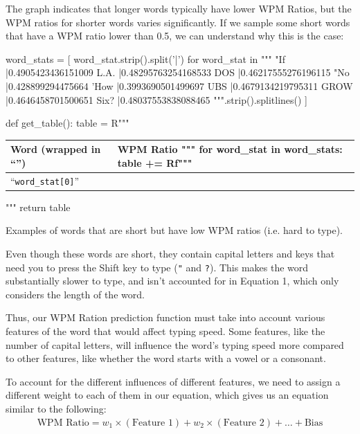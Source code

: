 \documentclass[12pt]{article}
\newcommand{\code}[1]{\texttt{#1}}
\begin{document}
The graph indicates that longer words typically have lower WPM Ratios, but the WPM ratios for shorter words varies significantly. If we sample some short words that have a WPM ratio lower than 0.5, we can understand why this is the case:

\begin{pycode}
word_stats = [
	word_stat.strip().split('|') for word_stat in """
		"If |0.4905423436151009
		L.A. |0.48295763254168533
		DOS |0.46217555276196115
		"No |0.428899294475664
		'How |0.3993690501499697
		UBS |0.4679134219795311
		GROW |0.4646458701500651
		Six? |0.48037553838088465
	""".strip().splitlines()
]

def get_table():
	table = R"""
		\begin{center}
		\noindent
		\begin{tabularx}{
			0.5\linewidth
		}{|X|X|}
		\hline
		Word (wrapped in ``'') & WPM Ratio
	"""
	for word_stat in word_stats:
		table += Rf"""
			\\\hline
			``\code{{{word_stat[0]}}}'' & {"%
		"""
	table += R"""
		\\\hline
		\end{tabularx}
		\end{center}
	"""
	return table
\end{pycode}

\begin{table}[H]
	\caption{Examples of words that are short but have low WPM ratios (i.e. hard to type).}
\end{table}

Even though these words are short, they contain capital letters and keys that need you to press the Shift key to type (\code{"} and \code{?}). This makes the word substantially slower to type, and isn't accounted for in Equation 1, which only considers the length of the word.

Thus, our WPM Ration prediction function must take into account various features of the word that would affect typing speed. Some features, like the number of capital letters, will influence the word's typing speed more compared to other features, like whether the word starts with a vowel or a consonant.

To account for the different influences of different features, we need to assign a different weight to each of them in our equation, which gives us an equation similar to the following:
\begin{align*}
	\text{WPM Ratio} = w_1 \times (\text{Feature 1}) + w_2 \times (\text{Feature 2}) + \dots + \text{Bias}
\end{align*}
\end{document}
